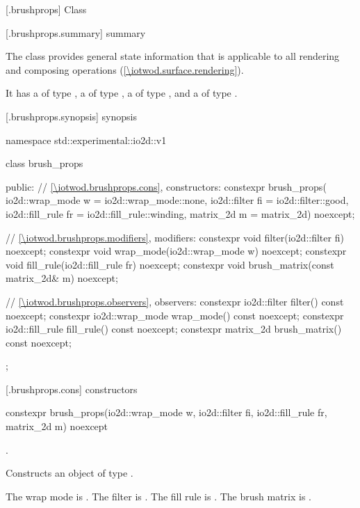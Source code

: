 
 [\iotwod.brushprops] {Class }

 [\iotwod.brushprops.summary] { summary}

\pnum
{}%
The  class provides general state information that is applicable to all rendering and composing operations (\ref{\iotwod.surface.rendering}).

\pnum
It has a  of type , a  of type , a  of type , and a  of type .

 [\iotwod.brushprops.synopsis] { synopsis}

\begin{codeblock}
namespace std::experimental::io2d::v1 {
  class brush_props {
  public:
    // \ref{\iotwod.brushprops.cons}, constructors:
    constexpr brush_props(
      io2d::wrap_mode w = io2d::wrap_mode::none,
      io2d::filter fi = io2d::filter::good,
      io2d::fill_rule fr = io2d::fill_rule::winding,
      matrix_2d m = matrix_2d{}) noexcept;

    // \ref{\iotwod.brushprops.modifiers}, modifiers:
    constexpr void filter(io2d::filter fi) noexcept;
    constexpr void wrap_mode(io2d::wrap_mode w) noexcept;
    constexpr void fill_rule(io2d::fill_rule fr) noexcept;
    constexpr void brush_matrix(const matrix_2d& m) noexcept;

    // \ref{\iotwod.brushprops.observers}, observers:
    constexpr io2d::filter filter() const noexcept;
    constexpr io2d::wrap_mode wrap_mode() const noexcept;
    constexpr io2d::fill_rule fill_rule() const noexcept;
    constexpr matrix_2d brush_matrix() const noexcept;
  };
}
\end{codeblock}

 [\iotwod.brushprops.cons] { constructors}

%
\begin{itemdecl}
constexpr brush_props(io2d::wrap_mode w, io2d::filter fi, io2d::fill_rule fr,
  matrix_2d m) noexcept
\end{itemdecl}
\begin{itemdescr}
\pnum
\requires
{}.

\pnum
\effects
Constructs an object of type .

\pnum
The wrap mode is . The filter is . The fill rule is . The brush matrix is .
\end{itemdescr}


